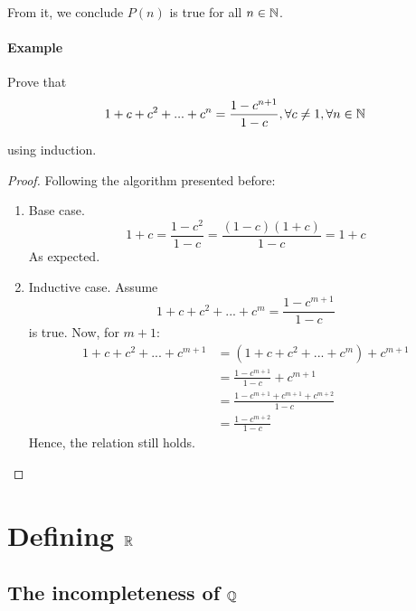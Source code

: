From it, we conclude $P(n)$ is true for all $n \in \mathbb{N}$.

\paragraph{Example}

Prove that 
\begin{equation}
    1 + c + c^2 + ... + c^n = \frac{1-c^{n+1}}{1-c}, \forall c \neq 1, \forall n \in \mathbb{N}
\end{equation}

using induction.

\begin{proof}
    Following the algorithm presented before:
    \begin{enumerate}
        \item Base case.
            \begin{equation}
                1 + c = \frac{1-c^2}{1 - c} = \frac{(1-c)(1+c)}{1-c} = 1 + c
            \end{equation}
            As expected.
        \item Inductive case.
            Assume
            \begin{equation}
                1 + c + c^2 + ... + c^m = \frac{1-c^{m+1}}{1-c}
            \end{equation}
            is true. Now, for $m+1$:
            \begin{equation}
                \begin{split}
                    1 + c + c^2 + ... + c^{m+1} & = (1 + c + c^2 + ... +c^{m}) + c^{m+1} \\
                    & = \frac{1-c^{m+1}}{1-c} + c^{m+1} \\
                    & = \frac{1-c^{m+1} + c^{m+1} + c^{m+2}}{1-c} \\
                    & = \frac{1-c^{m+2}}{1-c}
                \end{split}
            \end{equation}
            Hence, the relation still holds.
    \end{enumerate}
\end{proof}

\section{Defining $\mathbb{R}$}

\subsection{The incompleteness of $\mathbb{Q}$}


